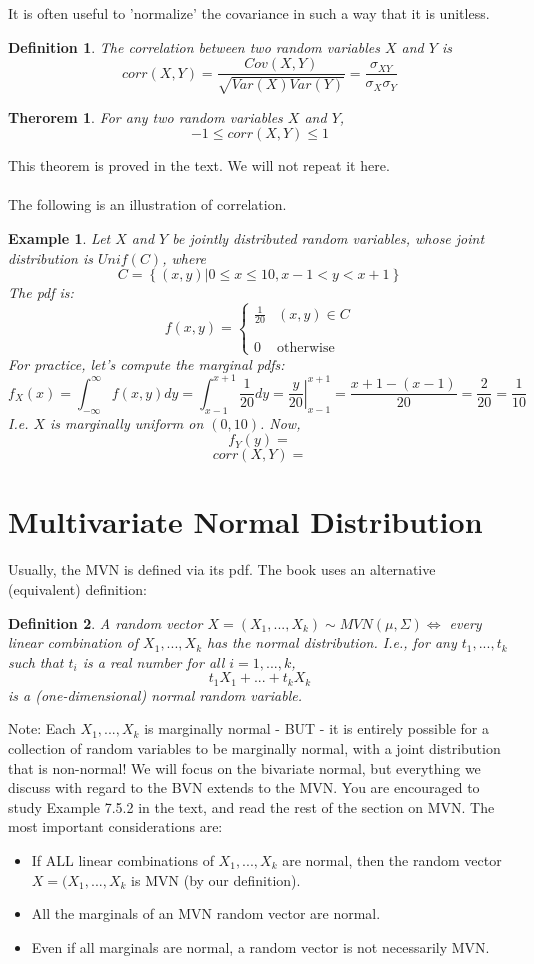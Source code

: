 \documentclass[12pt]{article} %
\newcommand{\infi}{\int_{-\infty}^\infty}
\newcommand{\pdf}[2]{\left\{\begin{matrix}
{#1} & {#2}\\\\\\0&\textrm{otherwise}
\end{matrix}\right.}
\newtheorem{defn}{Definition}
\newtheorem{example}{Example}
\newtheorem{thm}{Therorem}
\begin{document}
It is often useful to 'normalize' the covariance in such a way that it is unitless.

\begin{defn}
The correlation between two random variables $X$ and $Y$ is 
$$corr(X,Y) = \frac{Cov(X,Y)}{\sqrt{Var(X)Var(Y)}} = \frac{\sigma_{XY}}{\sigma_X\sigma_Y}$$
\end{defn}
\begin{thm}
For any two random variables $X$ and $Y$, 
$$-1\leq corr(X,Y)\leq 1$$
\end{thm}
This theorem is proved in the text. We will not repeat it here.\\\\
The following is an illustration of correlation.
\begin{example}
Let $X$ and $Y$ be jointly distributed random variables, whose joint distribution is $Unif(C)$, where
$$ C = \left\{(x,y)|0\leq x\leq 10,x-1<y<x+1\right\}$$
The pdf is:
$$f(x,y) = \pdf{{\frac{1}{20}}}{(x,y)\in C}$$
For practice, let's compute the marginal pdfs:
$$f_X(x) = \infi f(x,y) dy = \int_{x-1}^{x+1} \frac1{20} dy = \left. \frac{y}{20}\right\rvert_{x-1}^{x+1} = \frac{x+1-(x-1)}{20} = \frac2{20}=\frac1{10}$$
I.e. $X$ is marginally uniform on $(0,10)$. Now,
$$f_Y(y) = $$
$$corr(X,Y) = $$
\end{example}
\section{Multivariate Normal Distribution}
Usually, the MVN is defined via its pdf. The book uses an alternative (equivalent) definition:
\begin{defn}
A random vector $X=(X_1,...,X_k) \sim MVN(\mu,\Sigma) \iff$ every linear combination of $X_1,...,X_k$ has the normal distribution. I.e., for any $t_1,...,t_k$ such that $t_i$ is a real number for all $i=1,...,k$, 
$$t_1X_1 +...+ t_kX_k$$
is a (one-dimensional) normal random variable.
\end{defn}
Note: Each $X_1,...,X_k$ is marginally normal - BUT - it is entirely possible for a collection of random variables to be marginally normal, with a joint distribution that is non-normal! We will focus on the bivariate normal, but everything we discuss with regard to the BVN extends to the MVN. You are encouraged to study Example 7.5.2 in the text, and read the rest of the section on MVN. The most important considerations are:
\begin{itemize}
\item If ALL linear combinations of $X_1,...,X_k$ are normal, then the random vector $X=(X_1,...,X_k$ is MVN (by our definition).
\item All the marginals of an MVN random vector are normal.
\item Even if all marginals are normal, a random vector is not necessarily MVN.
\end{itemize}
\end{document}
